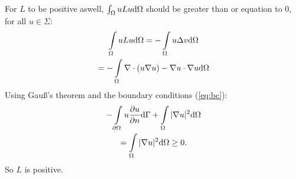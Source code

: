 For $L$ to be positive aswell, $\int\displaylimits_\Omega uLu \mathrm{d}\Omega$ should be greater than or equation to 0, for all $u\in \Sigma$:
\begin{gather*}
    \int\displaylimits_\Omega uLu \mathrm{d}\Omega = - \int\displaylimits_\Omega u\Delta v \mathrm{d}\Omega\\
    = -\int\displaylimits_\Omega \nabla \cdot(u\nabla u) - \nabla u\cdot\nabla u \mathrm{d}\Omega
\end{gather*} Using Gau\ss's theorem and the boundary conditions (\ref{eq:bc}):
\begin{gather*}
    -\int\displaylimits_{\partial\Omega} u\frac{\partial u}{\partial n} \mathrm{d}\Gamma + \int\displaylimits_{\Omega} |\nabla u|^2 \mathrm{d}\Omega \\
    =\int\displaylimits_\Omega |\nabla u|^2 \mathrm{d}\Omega \geq 0.
\end{gather*} So $L$ is positive.

